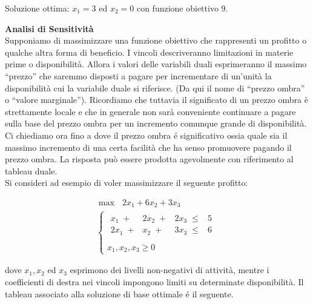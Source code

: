 \documentclass[10pt]{article}
\begin{document}
Soluzione ottima: $x_1 = 3$ ed $x_2 = 0$
con funzione obiettivo $9$.



\bigskip

{\large \bf Analisi di Sensitivit\`a}\\

Supponiamo di massimizzare una funzione obiettivo
che rappresenti un profitto o qualche altra forma
di beneficio.
I vincoli descriveranno limitazioni
in materie prime o disponibilit\`a.
Allora i valori delle variabili duali
esprimeranno il massimo ``prezzo''
che saremmo disposti a pagare per incrementare
di un'unit\`a la disponibilit\`a cui la variabile
duale si riferisce.
(Da qui il nome di ``prezzo ombra'' o ``valore marginale'').
Ricordiamo che tuttavia il significato di un prezzo
ombra \`e strettamente locale e che in generale
non sar\`a conveniente continuare a pagare sulla
base del prezzo ombra per un incremento comunque grande
di disponibilit\`a.
Ci chiediamo ora fino a dove il prezzo ombra
\'e significativo
ossia quale sia il massimo incremento 
di una certa facilit\`a
che ha senso promuovere pagando il prezzo ombra.
La risposta pu\`o essere prodotta agevolmente
con riferimento al tableau duale.\\

Si consideri ad esempio di voler massimizzare il seguente profitto:

\[
   \begin{array}{l}
        \max \mbox{\ }2x_1 + 6x_2 +3x_3\\
        \left\{
        \begin{array}{l}
        \begin{array}{rrrr}
             x_1 \;+&  2x_2 \;+& 2x_3 \;\leq &   5 \\
            2x_1 \;+&   x_2 \;+& 3x_3 \;\leq &   6 \\
        \end{array} \\
        x_1, x_2, x_3  \geq 0    
        \end{array}
        \right.
   \end{array}
\]

dove $x_1, x_2$ ed $x_3$
esprimono dei livelli non-negativi di attivit\`a,
mentre i coefficienti di destra nei vincoli
impongono limiti su determinate disponibilit\`a.
Il tableau associato alla soluzione di base ottimale \'e il seguente.
\end{document}
